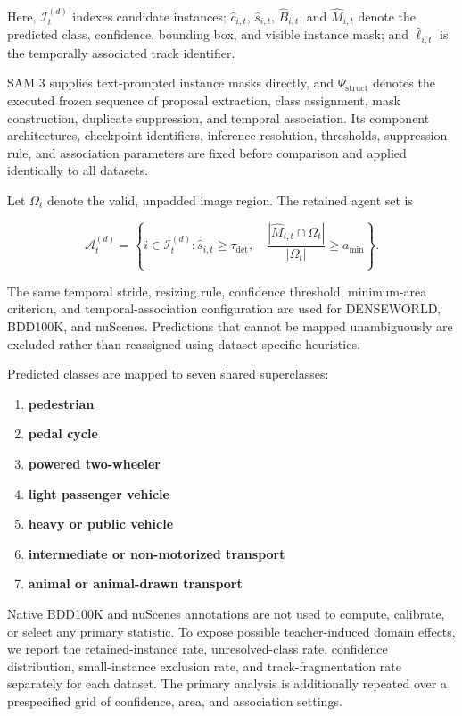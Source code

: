 Here, \(\mathcal I_t^{(d)}\) indexes candidate instances;
\(\hat c_{i,t}\), \(\hat s_{i,t}\), \(\hat B_{i,t}\), and
\(\hat M_{i,t}\) denote the predicted class, confidence, bounding box,
and visible instance mask; and \(\hat\ell_{i,t}\) is the temporally
associated track identifier.

SAM 3 supplies text-prompted instance masks directly, and
\(\Psi_{\mathrm{struct}}\) denotes the executed frozen sequence of
proposal extraction, class assignment, mask construction, duplicate
suppression, and temporal association. Its component architectures,
checkpoint identifiers, inference resolution, thresholds, suppression
rule, and association parameters are fixed before comparison and
applied identically to all datasets.

Let \(\Omega_t\) denote the valid, unpadded image region. The retained
agent set is

\begin{equation*}
\mathcal A_t^{(d)}
=
\left\{
i\in\mathcal I_t^{(d)}:
\hat s_{i,t}\ge\tau_{\mathrm{det}},
\quad
\frac{
|\hat M_{i,t}\cap\Omega_t|
}{
|\Omega_t|
}
\ge a_{\min}
\right\}.
\end{equation*}

The same temporal stride, resizing rule, confidence threshold,
minimum-area criterion, and temporal-association configuration are used
for DENSEWORLD, BDD100K, and nuScenes. Predictions that cannot be
mapped unambiguously are excluded rather than reassigned using
dataset-specific heuristics.

Predicted classes are mapped to seven shared superclasses:

\begin{enumerate}[
    label=(\roman*),
    leftmargin=2.8em,
    itemsep=1pt,
    topsep=2pt,
    parsep=0pt
]
    \item \textbf{pedestrian}
    \item \textbf{pedal cycle}
    \item \textbf{powered two-wheeler}
    \item \textbf{light passenger vehicle}
    \item \textbf{heavy or public vehicle}
    \item \textbf{intermediate or non-motorized transport}
    \item \textbf{animal or animal-drawn transport}
\end{enumerate}
Native BDD100K and nuScenes annotations are not used to compute,
calibrate, or select any primary statistic. To expose possible
teacher-induced domain effects, we report the retained-instance rate,
unresolved-class rate, confidence distribution, small-instance
exclusion rate, and track-fragmentation rate separately for each
dataset. The primary analysis is additionally repeated over a
prespecified grid of confidence, area, and association settings.



